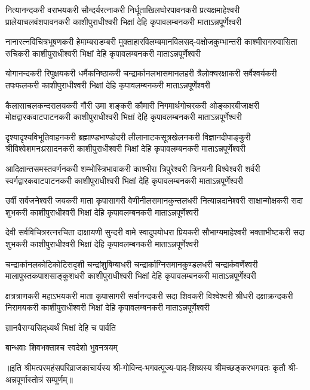 
\fourlineindentedshloka
{नित्यानन्दकरी वराभयकरी सौन्दर्यरत्नाकरी}
{निर्धूताखिलघोरपावनकरी प्रत्यक्षमाहेश्वरी}
{प्रालेयाचलवंशपावनकरी काशीपुराधीश्वरी}
{भिक्षां देहि कृपावलम्बनकरी माताऽन्नपूर्णेश्वरी}

\fourlineindentedshloka
{नानारत्नविचित्रभूषणकरी हेमाम्बराडम्बरी}
{मुक्ताहारविलम्बमानविलसद्-वक्षोजकुम्भान्तरी}
{काश्मीरागरुवासिता रुचिकरी काशीपुराधीश्वरी}
{भिक्षां देहि कृपावलम्बनकरी माताऽन्नपूर्णेश्वरी}

\fourlineindentedshloka
{योगानन्दकरी रिपुक्षयकरी धर्मैकनिष्ठाकरी}
{चन्द्रार्कानलभासमानलहरी त्रैलोक्यरक्षाकरी}
{सर्वैश्वर्यकरी तपःफलकरी काशीपुराधीश्वरी}
{भिक्षां देहि कृपावलम्बनकरी माताऽन्नपूर्णेश्वरी}

\fourlineindentedshloka
{कैलासाचलकन्दरालयकरी गौरी उमा शङ्करी}
{कौमारी निगमार्थगोचरकरी ओङ्कारबीजाक्षरी}
{मोक्षद्वारकवाटपाटनकरी काशीपुराधीश्वरी}
{भिक्षां देहि कृपावलम्बनकरी माताऽन्नपूर्णेश्वरी}

\fourlineindentedshloka
{दृश्यादृश्यविभूतिवाहनकरी ब्रह्माण्डभाण्डोदरी}
{लीलानाटकसूत्रखेलनकरी विज्ञानदीपाङ्कुरी}
{श्रीविश्वेशमनःप्रसादनकरी काशीपुराधीश्वरी}
{भिक्षां देहि कृपावलम्बनकरी माताऽन्नपूर्णेश्वरी}

\fourlineindentedshloka
{आदिक्षान्तसमस्तवर्णनकरी शम्भोस्त्रिभावाकरी}
{काश्मीरा त्रिपुरेश्वरी त्रिनयनी विश्वेश्वरी शर्वरी}
{स्वर्गद्वारकवाटपाटनकरी काशीपुराधीश्वरी}
{भिक्षां देहि कृपावलम्बनकरी माताऽन्नपूर्णेश्वरी}

\fourlineindentedshloka
{उर्वी सर्वजनेश्वरी जयकरी माता कृपासागरी}
{वेणीनीलसमानकुन्तलधरी नित्यान्नदानेश्वरी}
{साक्षान्मोक्षकरी सदा शुभकरी काशीपुराधीश्वरी}
{भिक्षां देहि कृपावलम्बनकरी माताऽन्नपूर्णेश्वरी}

\fourlineindentedshloka
{देवी सर्वविचित्ररत्नरचिता दाक्षायणी सुन्दरी}
{वामे स्वादुपयोधरा प्रियकरी सौभाग्यमाहेश्वरी}
{भक्ताभीष्टकरी सदा शुभकरी काशीपुराधीश्वरी}
{भिक्षां देहि कृपावलम्बनकरी माताऽन्नपूर्णेश्वरी}

\fourlineindentedshloka
{चन्द्रार्कानलकोटिकोटिसदृशी चन्द्रांशुबिम्बाधरी}
{चन्द्रार्काग्निसमानकुण्डलधरी चन्द्रार्कवर्णेश्वरी}
{मालापुस्तकपाशसाङ्कुशधरी काशीपुराधीश्वरी}
{भिक्षां देहि कृपावलम्बनकरी माताऽन्नपूर्णेश्वरी}

\fourlineindentedshloka
{क्षत्रत्राणकरी महाऽभयकरी माता कृपासागरी}
{सर्वानन्दकरी सदा शिवकरी विश्वेश्वरी श्रीधरी}
{दक्षाक्रन्दकरी निरामयकरी काशीपुराधीश्वरी}
{भिक्षां देहि कृपावलम्बनकरी माताऽन्नपूर्णेश्वरी}

{ज्ञानवैराग्यसिद्‌ध्यर्थं भिक्षां देहि च पार्वति}

{बान्धवाः शिवभक्ताश्च स्वदेशो भुवनत्रयम्}

॥इति श्रीमत्परमहंसपरिव्राजकाचार्यस्य श्री-गोविन्द-भगवत्पूज्य-पाद-शिष्यस्य
श्रीमच्छङ्करभगवतः कृतौ  श्री-अन्नपूर्णास्तोत्रं सम्पूर्णम्॥